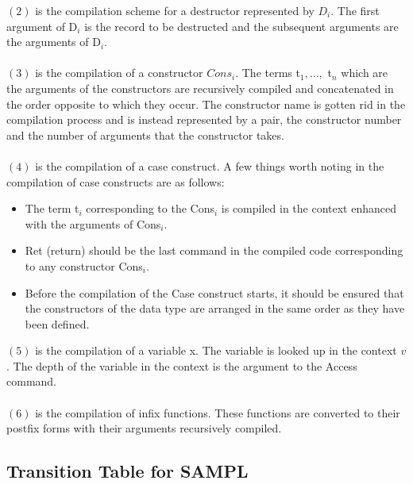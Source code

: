 \documentclass[11pt]{article}
\newcommand{\<}{\langle}
\renewcommand{\>}{\rangle}
\begin{document}
$(2)$ is the compilation scheme for a {\sf destructor} represented by $D_i$. The first argument of {\sf D$_i$} is the record to be destructed and the subsequent arguments are the arguments of {\sf D$_i$}. 
~~\\~~\\ 
$(3)$ is the compilation of a {\sf constructor} $Cons_i$. The terms {\sf t$_1,\ldots,$ t$_n$} which are the arguments of the constructors are recursively compiled and concatenated in the order opposite to which they occur. The constructor name is gotten rid in the compilation process and is instead represented by a pair, the constructor number and the number of arguments that the constructor takes.
~~\\~~\\
$(4)$ is the compilation of a {\sf case} construct. A few things worth noting in the compilation of {\sf case} constructs are as follows:
\begin {itemize}
\item The term {\sf t$_i$} corresponding to the {\sf Cons$_i$} is compiled in the context enhanced with the arguments of {\sf Cons$_i$}.
\item {\sf Ret (return)} should be the last command in the compiled code corresponding to any constructor {\sf Cons$_i$}.
\item Before the compilation of the {\sf Case} construct starts, it should be ensured that the constructors of the data type are arranged in the same order as they have been defined.
\end{itemize}
$(5)$ is the compilation of a {\sf variable x}. The variable is looked up in the context $v$. The depth of the variable in the context is the argument to the {\sf Access} command.
~~\\~~\\
$(6)$ is the compilation of infix functions. These functions are converted to their postfix forms with their arguments recursively compiled.


\subsection {Transition Table for SAMPL}
\end{document}
